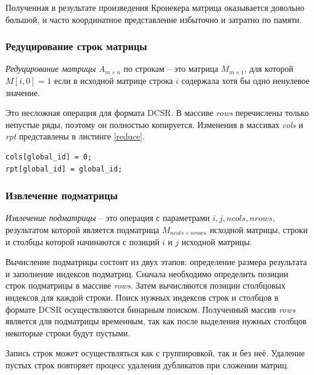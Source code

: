 \documentclass[14pt]{extarticle}
\newcommand{\txt}{\textit}
\begin{document}
	Полученная в результате произведения Кронекера матрица оказывается довольно большой, и часто координатное представление избыточно и затратно по памяти. 
	
	\subsubsection{Редуцирование строк матрицы}
	
	\emph{Редуцирование матрицы} $A_{m\times n}$ по строкам -- это матрица $M_{m\times 1}$, для которой $M[i,0] = 1$ если в исходной матрице строка $i$ содержала хотя бы одно ненулевое значение.
	
	Это несложная операция для формата DCSR. В массиве \txt{rows} перечислены только непустые ряды, поэтому он полностью копируется. Изменения в массивах \txt{cols} и \txt{rpt} представлены в листинге \ref{reduce}.
	
	\begin{minipage}{\linewidth}%
		
\begin{lstlisting}[breaklines=true, basicstyle=\small, caption={Массивы rpt и cols при редуцировании матрицы}, label={reduce}]
cols[global_id] = 0;
rpt[global_id] = global_id;
		\end{lstlisting}
	\end{minipage}
	
	
	\subsubsection{Извлечение подматрицы}
	
	\emph{Извлечение подматрицы} -- это операция с параметрами $i, j, ncols, nrows$, результатом которой является подматрица $M_{ncols \times nrows}$ исходной матрицы, строки и столбцы которой начинаются с позиций $i$ и $j$ исходной матрицы. 
	
	
	Вычисление подматрицы состоит из двух этапов: определение размера результата и заполнение индексов подматриц. Сначала необходимо определить позиции строк подматрицы в массиве \txt{rows}. Затем вычисляются позиции столбцовых индексов для каждой строки. Поиск нужных индексов строк и столбцов в формате DCSR осуществляются бинарным поиском. Полученный массив \txt{rows} является для подматрицы временным, так как после выделения нужных столбцов некоторые строки будут пустыми.
	
	Запись строк может осуществляться как с группировкой, так и без неё. Удаление пустых строк повторяет процесс удаления дубликатов при сложении матриц. 
	
\end{document}
